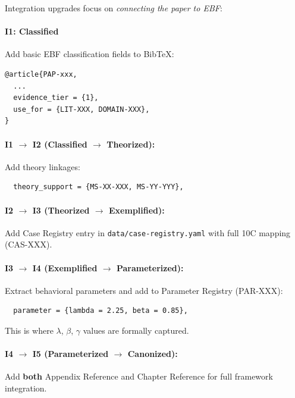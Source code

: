 Integration upgrades focus on \textit{connecting the paper to EBF}:

\paragraph{I1: Classified}
Add basic EBF classification fields to BibTeX:
\begin{verbatim}
@article{PAP-xxx,
  ...
  evidence_tier = {1},
  use_for = {LIT-XXX, DOMAIN-XXX},
}
\end{verbatim}

\paragraph{I1 $\rightarrow$ I2 (Classified $\rightarrow$ Theorized):}
\label{sec:upgrade-i2}
Add theory linkages:
\begin{verbatim}
  theory_support = {MS-XX-XXX, MS-YY-YYY},
\end{verbatim}

\paragraph{I2 $\rightarrow$ I3 (Theorized $\rightarrow$ Exemplified):}
\label{sec:upgrade-i3}
Add Case Registry entry in \texttt{data/case-registry.yaml} with full 10C mapping (CAS-XXX).

\paragraph{I3 $\rightarrow$ I4 (Exemplified $\rightarrow$ Parameterized):}
Extract behavioral parameters and add to Parameter Registry (PAR-XXX):
\begin{verbatim}
  parameter = {lambda = 2.25, beta = 0.85},
\end{verbatim}
This is where $\lambda$, $\beta$, $\gamma$ values are formally captured.

\paragraph{I4 $\rightarrow$ I5 (Parameterized $\rightarrow$ Canonized):}
Add \textbf{both} Appendix Reference and Chapter Reference for full framework integration.


